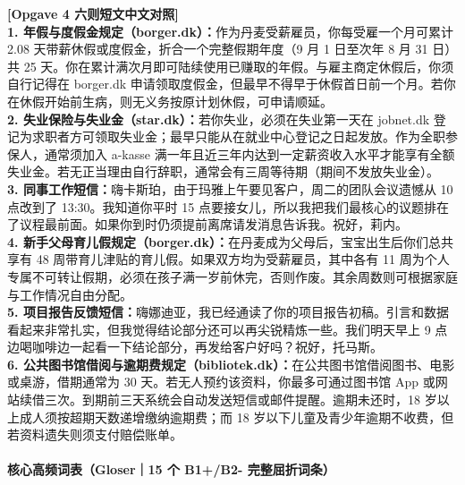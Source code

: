 \begin{transbox}
\small
\textbf{\color{NCDTeal}[Opgave 4 六则短文中文对照]}\\
\textbf{1. 年假与度假金规定（borger.dk）：}作为丹麦受薪雇员，你每受雇一个月可累计 2.08 天带薪休假或度假金，折合一个完整假期年度（9 月 1 日至次年 8 月 31 日）共 25 天。你在累计满次月即可陆续使用已赚取的年假。与雇主商定休假后，你须自行记得在 borger.dk 申请领取度假金，但最早不得早于休假首日前一个月。若你在休假开始前生病，则无义务按原计划休假，可申请顺延。\\
\textbf{2. 失业保险与失业金（star.dk）：}若你失业，必须在失业第一天在 jobnet.dk 登记为求职者方可领取失业金；最早只能从在就业中心登记之日起发放。作为全职参保人，通常须加入 a-kasse 满一年且近三年内达到一定薪资收入水平才能享有全额失业金。若无正当理由自行辞职，通常会有三周等待期（期间不发放失业金）。\\
\textbf{3. 同事工作短信：}嗨卡斯珀，由于玛雅上午要见客户，周二的团队会议遗憾从 10 点改到了 13:30。我知道你平时 15 点要接女儿，所以我把我们最核心的议题排在了议程最前面。如果你到时仍须提前离席请发消息告诉我。祝好，莉内。\\
\textbf{4. 新手父母育儿假规定（borger.dk）：}在丹麦成为父母后，宝宝出生后你们总共享有 48 周带育儿津贴的育儿假。如果双方均为受薪雇员，其中各有 11 周为个人专属不可转让假期，必须在孩子满一岁前休完，否则作废。其余周数则可根据家庭与工作情况自由分配。\\
\textbf{5. 项目报告反馈短信：}嗨娜迪亚，我已经通读了你的项目报告初稿。引言和数据看起来非常扎实，但我觉得结论部分还可以再尖锐精炼一些。我们明天早上 9 点边喝咖啡边一起看一下结论部分，再发给客户好吗？祝好，托马斯。\\
\textbf{6. 公共图书馆借阅与逾期费规定（bibliotek.dk）：}在公共图书馆借阅图书、电影或桌游，借期通常为 30 天。若无人预约该资料，你最多可通过图书馆 App 或网站续借三次。到期前三天系统会自动发送短信或邮件提醒。逾期未还时，18 岁以上成人须按超期天数递增缴纳逾期费；而 18 岁以下儿童及青少年逾期不收费，但若资料遗失则须支付赔偿账单。
\end{transbox}

\paragraph*{核心高频词表（Gloser｜15 个 B1+/B2- 完整屈折词条）}

